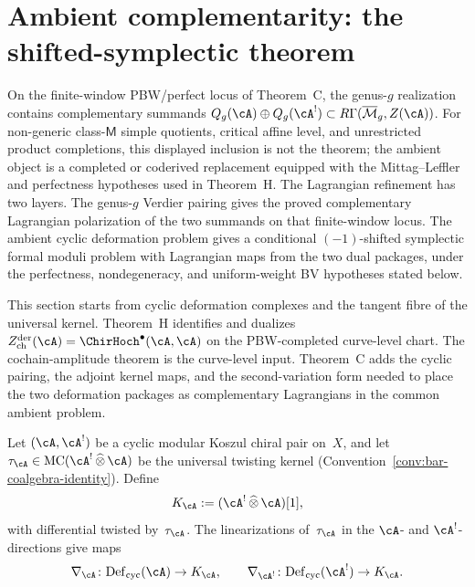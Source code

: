 
\section{Ambient complementarity: the shifted-symplectic theorem}
\label{sec:ambient-complementarity}

On the finite-window PBW/perfect locus of Theorem~C, the genus-$g$
realization contains complementary summands
$Q_g(\cA) \oplus Q_g(\cA^!)
\subset R\Gamma(\overline{\mathcal{M}}_g, Z(\cA))$.
For non-generic class-\(\mathsf M\) simple quotients, critical affine
level, and unrestricted product completions, this displayed inclusion
is not the theorem; the ambient object is a completed or coderived
replacement equipped with the Mittag--Leffler and perfectness
hypotheses used in Theorem~H. The Lagrangian refinement has two
layers. The genus-$g$ Verdier pairing gives the proved complementary
Lagrangian polarization of the two summands on that finite-window
locus. The ambient cyclic deformation problem gives a conditional
$(-1)$-shifted symplectic formal moduli problem with Lagrangian maps
from the two dual packages, under the perfectness, nondegeneracy, and
uniform-weight BV hypotheses stated below.

This section starts from cyclic deformation complexes and the tangent
fibre of the universal kernel. Theorem~H identifies and dualizes
$Z^{\mathrm{der}}_{\mathrm{ch}}(\cA)=\ChirHoch^\bullet(\cA,\cA)$ on
the PBW-completed curve-level chart. The cochain-amplitude theorem is
the curve-level input. Theorem~C adds the cyclic pairing, the adjoint
kernel maps, and the second-variation form needed to place the two
deformation packages as complementary Lagrangians in the common
ambient problem.

\begin{definition}
\label{def:kernel-deformation-complex}
Let $(\cA, \cA^!)$ be a cyclic modular Koszul chiral pair
on~$X$, and let
$\tau_\cA \in \mathrm{MC}(\cA^! \,\widehat{\otimes}\, \cA)$
be the universal twisting kernel
(Convention~\ref{conv:bar-coalgebra-identity}). Define
\[
K_\cA := (\cA^! \,\widehat{\otimes}\, \cA)[1],
\]
with differential twisted by~$\tau_\cA$. The linearizations
of~$\tau_\cA$ in the $\cA$- and $\cA^!$-directions give maps
\[
\nabla_\cA \colon \mathrm{Def}_{\mathrm{cyc}}(\cA)
\to K_\cA,
\qquad
\nabla_{\cA^!} \colon \mathrm{Def}_{\mathrm{cyc}}(\cA^!)
\to K_\cA.
\]
\end{definition}


